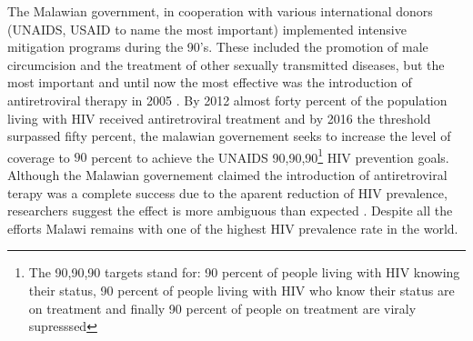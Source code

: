 The Malawian government, in cooperation  with various international donors (UNAIDS, USAID to name the most important) implemented intensive mitigation programs during the 90's. These included the promotion of male circumcision and the treatment of other sexually transmitted diseases, but the most important and until now the most effective was the introduction of antiretroviral therapy in 2005 . By 2012 almost forty percent of the population living with HIV received antiretroviral treatment and by 2016 the threshold surpassed fifty percent, the malawian governement seeks to increase the level of coverage to $90$ percent to achieve the UNAIDS 90,90,90\footnote{The 90,90,90 targets stand for: 90 percent of people living with HIV knowing their status, 90 percent of people living with HIV who know their status are on treatment and finally 90 percent of people on treatment are viraly supresssed} HIV prevention goals. Although the Malawian governement claimed the introduction of antiretroviral terapy was a complete success due to the aparent reduction of HIV prevalence, researchers suggest the effect is more ambiguous than expected \cite{michelle}. Despite all the efforts Malawi remains with one of the highest HIV prevalence rate in the world. \\
